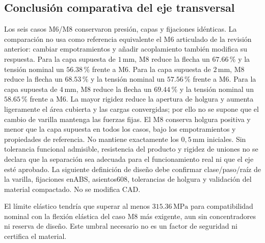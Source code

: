 \subsection{Conclusión comparativa del eje transversal}
Los seis casos M6/M8 conservaron presión, capas y fijaciones idénticas. La comparación
no usa como referencia equivalente el M6 articulado de la revisión anterior: cambiar
empotramientos y añadir acoplamiento también modifica su respuesta.
Para la capa supuesta de $1\,\mathrm{mm}$, M8 reduce la flecha un $67.66\,\%$ y la tensión nominal un $56.38\,\%$ frente a M6. Para la capa supuesta de $2\,\mathrm{mm}$, M8 reduce la flecha un $68.53\,\%$ y la tensión nominal un $57.56\,\%$ frente a M6. Para la capa supuesta de $4\,\mathrm{mm}$, M8 reduce la flecha un $69.44\,\%$ y la tensión nominal un $58.65\,\%$ frente a M6. 
La mayor rigidez reduce la apertura de holgura y aumenta ligeramente el área cubierta y las cargas convergidas;
por ello no se supone que el cambio de varilla mantenga las fuerzas fijas.
El M8 conserva holgura positiva y menor que la capa supuesta en todos los casos, bajo los
empotramientos y propiedades de referencia. No mantiene exactamente los $0,5\,\mathrm{mm}$ iniciales.
Sin tolerancia funcional admisible, resistencia del producto y rigidez de uniones no se declara
que la separación sea adecuada para el funcionamiento real ni que el eje esté aprobado.
La siguiente definición de diseño debe confirmar clase/paso/raíz de la varilla, fijaciones enABS,
asientos608, tolerancias de holgura y validación del material compactado. No se modifica CAD.

El límite elástico tendría que superar al menos $315.36\,\mathrm{MPa}$ para compatibilidad nominal con la flexión elástica del caso M8 más exigente, aun sin concentradores ni reserva de diseño. Este umbral necesario no es un factor de seguridad ni certifica el material.
